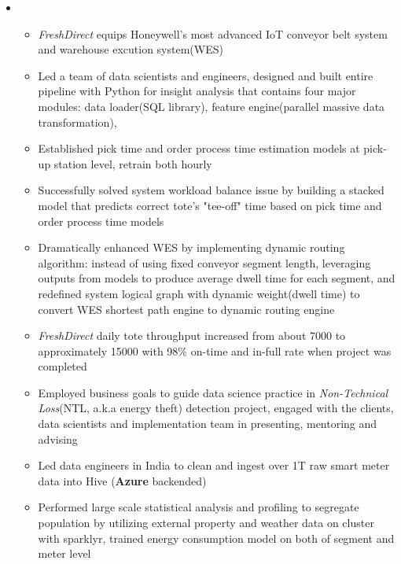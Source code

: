 \documentclass[11pt,a4paper,sans]{moderncv}        %
\begin{document}
\begin{itemize}
	\item{
		{\vspace{3pt}
			\begin{itemize}
				\item \emph{FreshDirect} equips Honeywell's most advanced IoT conveyor belt system and warehouse excution system(WES)
				\item Led a team of data scientists and engineers, designed and built entire pipeline with Python for insight analysis that contains four major modules: data loader(SQL library), feature engine(parallel massive data transformation), 
				\item Established pick time and order process time estimation models at pick-up station level, retrain both hourly
				\item Successfully solved system workload balance issue by building a stacked model that predicts correct tote's "tee-off" time based on pick time and order process time models
				\item Dramatically enhanced WES by implementing dynamic routing algorithm: instead of using fixed conveyor segment length, leveraging outputs from models to produce average dwell time for each segment, and  redefined system logical graph with dynamic weight(dwell time) to convert WES shortest path engine to dynamic routing engine
				\item \emph{FreshDirect} daily tote throughput increased from about 7000 to approximately 15000 with 98\% on-time and in-full rate when project was completed
				\item Employed business goals to guide data science practice in \emph{Non-Technical Loss}(NTL, a.k.a energy theft) detection project, engaged with the clients, data scientists and implementation team in presenting, mentoring and advising 
				\item Led data engineers in India to clean and ingest over 1T raw smart meter data into Hive (\textbf{Azure} backended)
				\item Performed large scale statistical analysis and profiling to segregate population by utilizing external property and weather data on cluster with sparklyr, trained energy consumption model on both of segment and meter level

\end{itemize}}}
\end{itemize}
\end{document}
